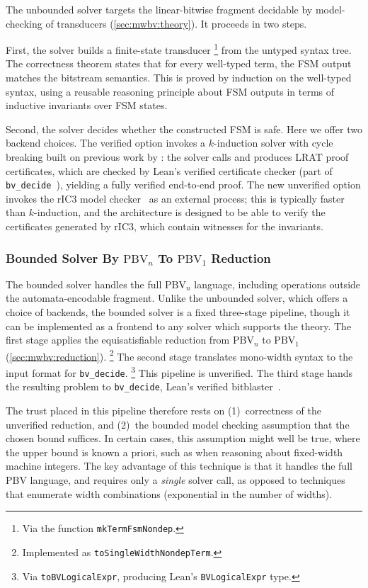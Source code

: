 The unbounded solver targets the linear-bitwise fragment decidable by
model-checking of transducers (\cref{sec:mwbv:theory}). It proceeds in
two steps.

First, the solver builds a finite-state transducer%
\footnote{Via the function \texttt{mkTermFsmNondep}.}
from the untyped syntax tree.
The correctness theorem states that for every well-typed term,
the FSM output matches the bitstream semantics.
This is proved by induction on the well-typed syntax,
using a reusable reasoning principle about FSM outputs
in terms of inductive invariants over FSM states.

Second, the solver decides whether the constructed FSM is safe.
Here we offer two backend choices.
The verified option invokes a $k$-induction solver with cycle breaking built on
previous work by \citet{bhat2025certified}:
the solver calls \cadical{} and produces LRAT proof certificates,
which are checked by Lean's verified certificate checker
(part of \texttt{bv\_decide}~\cite{boving2025interactive}),
yielding a fully verified end-to-end proof.
The new unverified option invokes the rIC3 model checker~\cite{ric3} as an
external process; this is typically faster than $k$-induction, and the
architecture is designed to be able to verify the certificates generated by
rIC3, which contain witnesses for the invariants.

\subsubsection{Bounded Solver By $\text{PBV}_n$ To $\text{PBV}_1$ Reduction}

The bounded solver handles the full $\text{PBV}_n$ language, including
operations outside the automata-encodable fragment. Unlike the unbounded solver,
which offers a choice of backends, the bounded solver is a fixed three-stage
pipeline, though it can be implemented as a frontend to any solver which
supports the \qfbv{} theory.
%
The first stage applies the equisatisfiable reduction
from $\text{PBV}_n$ to $\text{PBV}_1$ (\cref{sec:mwbv:reduction}).%
\footnote{Implemented as \texttt{toSingleWidthNondepTerm}.}
The second stage translates mono-width syntax to the input format
for \texttt{bv\_decide}.%
\footnote{Via \texttt{toBVLogicalExpr}, producing Lean's \texttt{BVLogicalExpr} type.}
This pipeline is unverified.
The third stage hands the resulting \qfbv{} problem to \texttt{bv\_decide},
Lean's verified bitblaster~\cite{boving2025interactive}.

The trust placed in this pipeline therefore rests on
(1)~correctness of the unverified reduction, and
(2)~the bounded model checking assumption that the chosen bound suffices.
  In certain cases, this assumption might well be true, where the upper bound is known a priori,
  such as when reasoning about fixed-width machine integers.
The key advantage of this technique is that it handles the full PBV language,
and requires only a \emph{single} solver call,
as opposed to techniques that enumerate width combinations
(exponential in the number of widths).

